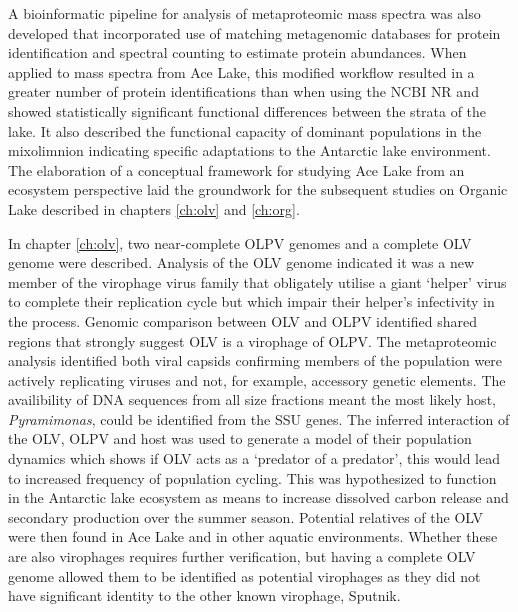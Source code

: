 A bioinformatic pipeline for analysis of metaproteomic mass spectra was also developed that incorporated use of matching metagenomic databases for protein identification and spectral counting to estimate protein abundances.
When applied to mass spectra from Ace Lake, this modified workflow resulted in a greater number of protein identifications than when using the \ac{NCBI} \ac{NR} and showed statistically significant functional differences between the strata of the lake.
It also described the functional capacity of dominant populations in the mixolimnion indicating specific adaptations to the Antarctic lake environment.
The elaboration of a conceptual framework for studying Ace Lake from an ecosystem perspective laid the groundwork for the subsequent studies on Organic Lake described in chapters \ref{ch:olv} and \ref{ch:org}.

In chapter \ref{ch:olv}, two near-complete \ac{OLPV} genomes and a complete \ac{OLV} genome were described.
Analysis of the \ac{OLV} genome indicated it was a new member of the virophage virus family that obligately utilise a  giant `helper' virus to complete their replication cycle but which impair their helper's infectivity in the process.
Genomic comparison between \ac{OLV} and \ac{OLPV} identified shared regions that strongly suggest \ac{OLV} is a virophage of \ac{OLPV}.
The metaproteomic analysis identified both viral capsids confirming members of the population were actively replicating viruses and not, for example, accessory genetic elements.
The availibility of \textsc{DNA} sequences from all size fractions meant the most likely host, \emph{Pyramimonas}, could be identified from the \ac{SSU} genes.
The inferred interaction of the \ac{OLV}, \ac{OLPV} and host was used to generate a model of their population dynamics which shows if \ac{OLV} acts as a `predator of a predator', this would lead to increased frequency of population cycling.
This was hypothesized to function in the Antarctic lake ecosystem as means to increase dissolved carbon release and secondary production over the summer season.
Potential relatives of the \ac{OLV} were then found in Ace Lake and in other aquatic environments. 
Whether these are also virophages requires further verification, but having a complete \ac{OLV} genome allowed them to be identified as potential virophages as they did not have significant identity to the other known virophage, Sputnik.


